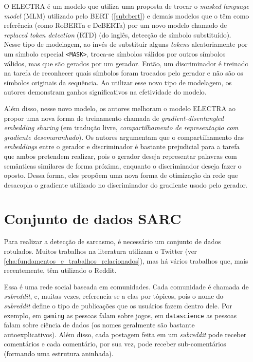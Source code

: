 O ELECTRA é um modelo que utiliza uma proposta de trocar o \textit{masked
language model} (MLM) utilizado pelo BERT (\ref{sub:bert}) e demais modelos que
o têm como referência (como RoBERTa e DeBERTa) por um novo modelo chamado de
\textit{replaced token detection} (RTD) (do inglês, detecção de símbolo
substituído). Nesse tipo de modelagem, ao invés de substituir alguns
\textit{tokens} aleatoriamente por um símbolo especial \texttt{<MASK>}, troca-se
símbolos válidos por outros símbolos válidos, mas que são gerados por um
gerador. Então, um discriminador é treinado na tarefa de reconhecer quais
símbolos foram trocados pelo gerador e não são os símbolos originais da
sequência. Ao utilizar esse novo tipo de modelagem, os autores demonstram ganhos
significativos na efetividade do modelo.

Além disso, nesse novo modelo, os autores melhoram o modelo ELECTRA ao propor
uma nova forma de treinamento chamada de \textit{gradient-disentangled embedding
sharing} (em tradução livre, \textit{compartilhamento de representação com
gradiente desemaranhado}). Os autores argumentam que o compartilhamento das
\textit{embeddings} entre o gerador e discriminador é bastante prejudicial para
a tarefa que ambos pretendem realizar, pois o gerador deseja representar
palavras com semânticas similares de forma próxima, enquanto o discriminador
deseja fazer o oposto. Dessa forma, eles propõem uma nova forma de otimização da
rede que desacopla o gradiente utilizado no discriminador do gradiente usado
pelo gerador.

\section{Conjunto de dados SARC}%
\label{sec:conjunto_de_dados_sarc}

Para realizar a detecção de sarcasmo, é necessário um conjunto de dados
rotulados. Muitos trabalhos na literatura utilizam o Twitter (ver
\ref{cha:fundamentos_e_trabalhos_relacionados}), mas há vários trabalhos que,
mais recentemente, têm utilizado o Reddit.

Essa é uma rede social baseada em comunidades. Cada comunidade é chamada de
\textit{subreddit}, e, muitas vezes, referencia-se a elas por tópicos, pois o
nome do \textit{subreddit} define o tipo de publicações que os usuários fazem
dentro dele. Por exemplo, em \texttt{gaming} as pessoas falam sobre jogos, em
\texttt{datascience} as pessoas falam sobre ciência de dados (os nomes
geralmente são bastante autoexplicativos). Além disso, cada postagem feita em um
\textit{subreddit} pode receber comentários e cada comentário, por sua vez, pode
receber sub-comentários (formando uma estrutura aninhada).

